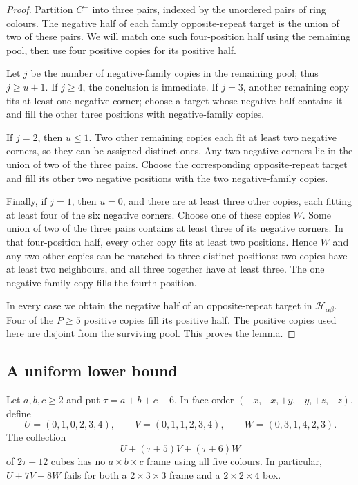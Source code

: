 \begin{proof}
Partition $C^-$ into three pairs, indexed by the unordered pairs of ring
colours. The negative half of each family opposite-repeat target is the
union of two of these pairs. We will match one such four-position half
using the remaining pool, then use four positive copies for its positive
half.

Let $j$ be the number of negative-family copies in the remaining pool;
thus $j\ge u+1$. If $j\ge4$, the conclusion is immediate. If $j=3$,
another remaining copy fits at least one negative corner; choose a target
whose negative half contains it and fill the other three positions with
negative-family copies.

If $j=2$, then $u\le1$. Two other remaining copies each fit at least two
negative corners, so they can be assigned distinct ones. Any two negative
corners lie in the union of two of the three pairs. Choose the corresponding
opposite-repeat target and fill its other two negative positions with the
two negative-family copies.

Finally, if $j=1$, then $u=0$, and there are at least three other copies,
each fitting at least four of the six negative corners. Choose one of
these copies $W$. Some union of two of the three pairs contains at least
three of its negative corners. In that four-position half, every other
copy fits at least two positions. Hence $W$ and any two other copies can
be matched to three distinct positions: two copies have at least two
neighbours, and all three together have at least three. The one
negative-family copy fills the fourth position.

In every case we obtain the negative half of an opposite-repeat target
in $\mathcal H_{\alpha\beta}$. Four of the $P\ge5$ positive copies fill its
positive half. The positive copies used here are disjoint from the surviving pool. This proves the lemma.
\end{proof}


\subsection{A uniform lower bound}

\begin{samepage}
\begin{lemma}\label{lem:thin-three-variety-obstruction}
Let $a,b,c\ge2$ and put $\tau=a+b+c-6$. In face order
$(+x,-x,+y,-y,+z,-z)$, define
\[
 U=(0,1,0,2,3,4),\qquad
 V=(0,1,1,2,3,4),\qquad
 W=(0,3,1,4,2,3).
\]
The collection
\[
 U+(\tau+5)V+(\tau+6)W
\]
of $2\tau+12$ cubes has no $a\times b\times c$ frame using all five
colours. In particular, $U+7V+8W$ fails for both a $2\times3\times3$
frame and a $2\times2\times4$ box.
\end{lemma}
\end{samepage}

